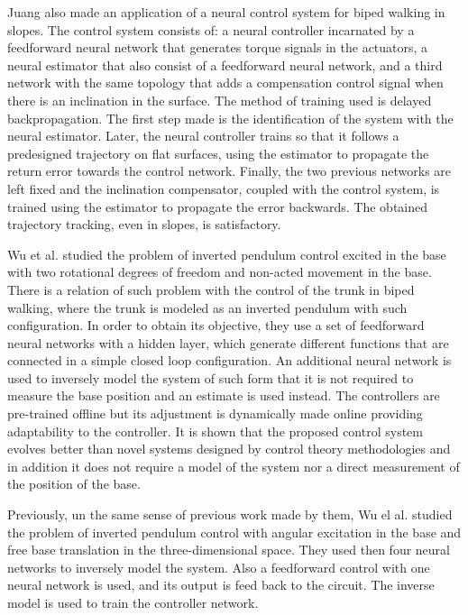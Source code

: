 Juang \cite{Juang01Intelligent} also made an application of a neural control system for biped walking in slopes. The control system consists of: a neural controller incarnated by a feedforward neural network that generates torque signals in the actuators, a neural estimator that also consist of a feedforward neural network, and a third network with the same topology that adds a compensation control signal when there is an inclination in the surface. The method of training used is delayed backpropagation. The first step made is the identification of the system with the neural estimator. Later, the neural controller trains so that it follows a predesigned trajectory on flat surfaces, using the estimator to propagate the return error towards the control network. Finally, the two previous networks are left fixed and the inclination compensator, coupled with the control system, is trained using the estimator to propagate the error backwards. The obtained trajectory tracking, even in slopes, is satisfactory. 


Wu et al. \cite{Wu02Neural-based} studied the problem of inverted pendulum control excited in the base with two rotational degrees of freedom and non-acted movement in the base. There is a relation of such problem with the control of the trunk in biped walking, where the trunk is modeled as an inverted pendulum with such configuration. In order to obtain its objective, they use a set of feedforward neural networks with a hidden layer, which generate different functions that are connected in a simple closed loop configuration. An additional neural network is used to inversely model the system of such form that it is not required to measure the base position and an estimate is used instead. The controllers are pre-trained offline but its adjustment is dynamically made online providing adaptability to the controller. It is shown that the proposed control system evolves better than novel systems designed by control theory methodologies and in addition it does not require a model of the system nor a direct measurement of the position of the base.


Previously, un the same sense of previous work made by them, Wu el al. \cite{Wu02Neural} studied the problem of inverted pendulum control with angular excitation in the base and free base translation in the three-dimensional space. They used then four neural networks to inversely model the system. Also a feedforward control with one neural network is used, and its output is feed back to the circuit. The inverse model is used to train the controller network. 


